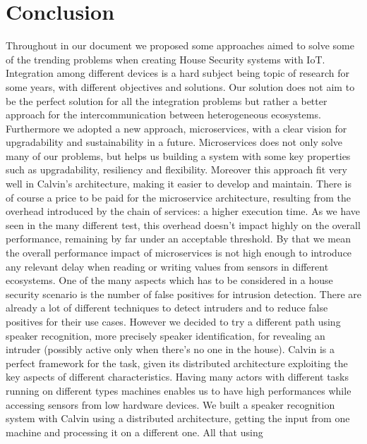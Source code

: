 \chapter{Conclusion}

Throughout in our document we proposed some approaches aimed
to solve some of the trending problems when creating House Security systems
with IoT. \newline
Integration among different devices is a hard subject being topic of research
for some years, with different objectives and solutions. Our solution does not aim
to be the perfect solution for all the integration problems but rather
a better approach for the intercommunication between heterogeneous ecosystems.
Furthermore we adopted a new approach, microservices, with a clear vision for
upgradability and sustainability in a future. Microservices does not only
solve many of our problems, but helps us building a system with some key
properties such as upgradability, resiliency and flexibility. Moreover
this approach fit very well in Calvin's architecture, making it easier to develop
and maintain. There is of course a price to be paid for the microservice architecture,
resulting from the overhead introduced by the chain of services: a higher execution time.
As we have seen in the many different test, this overhead doesn't impact highly on the
overall performance, remaining by far under an acceptable threshold. By that we mean
the overall performance impact of microservices is not high enough to introduce
any relevant delay when reading or writing values from sensors in different
ecosystems.\newline
One of the many aspects which has to be considered in a house security scenario is the
number of false positives for intrusion detection. There are already a lot of different
techniques to detect intruders and to reduce false positives for their use cases.
However we decided to try a different path using speaker recognition, more precisely
speaker identification, for revealing an intruder (possibly active only when there's no one in the house).
Calvin is a perfect framework for the task, given its distributed architecture exploiting the
key aspects of different characteristics. Having many actors with different tasks
running on different types machines enables us to have high performances
while accessing sensors from low hardware devices.\newline
We built a speaker recognition system with Calvin using a distributed architecture,
getting the input from one machine and processing it on a different one. All that using
